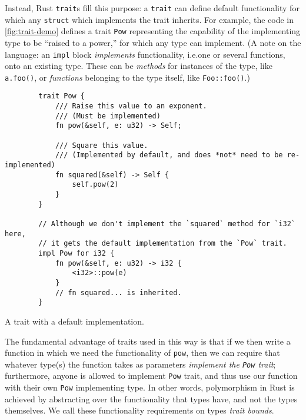 \documentclass{report}
\newenvironment{code}{\captionsetup{type=listing}}{}
\begin{document}
Instead, Rust \Verb+trait+s fill this purpose: a \Verb+trait+ can define default
functionality for which any \Verb+struct+ which implements the trait inherits.
For example, the code in \cref{fig:trait-demo} defines a trait \Verb+Pow+
representing the capability of the implementing type to be ``raised to a
power,'' for which any type can implement. (A note on the language: an
\Verb+impl+ block \emph{implements} functionality, i.e.\@ one or several
functions, onto an existing type. These can be \emph{methods} for instances of
the type, like \Verb+a.foo()+, or \emph{functions} belonging to the type itself,
like \Verb+Foo::foo()+.)
\begin{code}
    \begin{verbatim}
        trait Pow {
            /// Raise this value to an exponent.
            /// (Must be implemented)
            fn pow(&self, e: u32) -> Self;

            /// Square this value.
            /// (Implemented by default, and does *not* need to be re-implemented)
            fn squared(&self) -> Self {
                self.pow(2)
            }
        }

        // Although we don't implement the `squared` method for `i32` here,
        // it gets the default implementation from the `Pow` trait.
        impl Pow for i32 {
            fn pow(&self, e: u32) -> i32 {
                <i32>::pow(e)
            }
            // fn squared... is inherited.
        }
    \end{verbatim}
    \caption{A trait with a default implementation.}
    \label{fig:trait-demo}
\end{code}
\noindent
The fundamental advantage of traits used in this way is that if we then write a
function in which we need the functionality of \Verb+pow+, then we can require
that whatever type(s) the function takes as parameters \emph{implement the
\Verb+Pow+ trait}; furthermore, anyone is allowed to implement \Verb+Pow+
trait, and thus use our function with their own \Verb+Pow+ implementing type.
In other words, polymorphism in Rust is achieved by abstracting over the
functionality that types have, and not the types themselves.
We call these functionality requirements on types \emph{trait bounds}.
\end{document}
